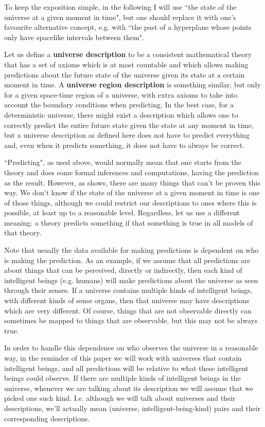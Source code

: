\documentclass[a4paper
]{article}
\newcommand{\definitie}[1]{\textbf{#1}}
\newcommand{\ghilimele}[1]{``#1"}
\begin{document}
To keep the exposition simple, in the following I will use
\ghilimele{the state of the universe at a given moment in time},
but one should replace it with one's favourite alternative concept, e.g.
with \ghilimele{the past of a hyperplane whose points only have spacelike
intervals between them}.

Let us define a \definitie{universe description} to be a
consistent mathematical theory that has
a set of axioms which is at most countable and which allows making
predictions about the future state of the universe given its state
at a certain moment in time. A \definitie{universe region description}
is something similar, but only for a given space-time region of a universe,
with extra axioms to take into account the boundary conditions when predicting.
In the best case, for a deterministic universe, there might exist
a description which allows one to correctly predict the entire future state
given the state at any moment in time, but a universe description
as defined here does not have to predict everything and,
even when it predicts something, it does not have to always be correct.

\ghilimele{Predicting}, as used above, would normally mean that one
starts from the theory and does some formal inferences and computations, having
the prediction as the result.
However, as \cite{Calude2013} shows, there are many
things that can't be proven this way.
We don't know if the state of the universe at a given moment in time is one of
those things, although we could restrict our descriptions to ones where this
is possible, at least up to a reasonable level.
Regardless, let us use a different meaning: a theory predicts something if
that something is true in all models of that theory.

Note that usually the data available for making predictions is dependent
on who is making the prediction. As an example, if we assume that
all predictions are about things that can be perceived, directly or indirectly,
then
each kind of intelligent beings (e.g. humans) will make predictions
about the universe as seen through their senses. If a universe contains
multiple kinds of intelligent beings, with different kinds of
sense organs, then that universe may have descriptions which are
very different.
Of course, things that are not observable directly can sometimes be mapped
to things that are observable, but this may not be always true.

In order to handle this dependence on who observes the universe
in a reasonable way, in the reminder of this paper we will work with universes
that contain intelligent beings,
and all predictions will be relative to what these intelligent beings
could observe.
If there are multiple kinds of intelligent beings in the
universe, whenever we are talking about its description
we will assume that we picked one such kind.
I.e. although we
will talk about universes and their descriptions, we'll actually mean
(universe, intelligent-being-kind) pairs and their corresponding descriptions.
\end{document}

